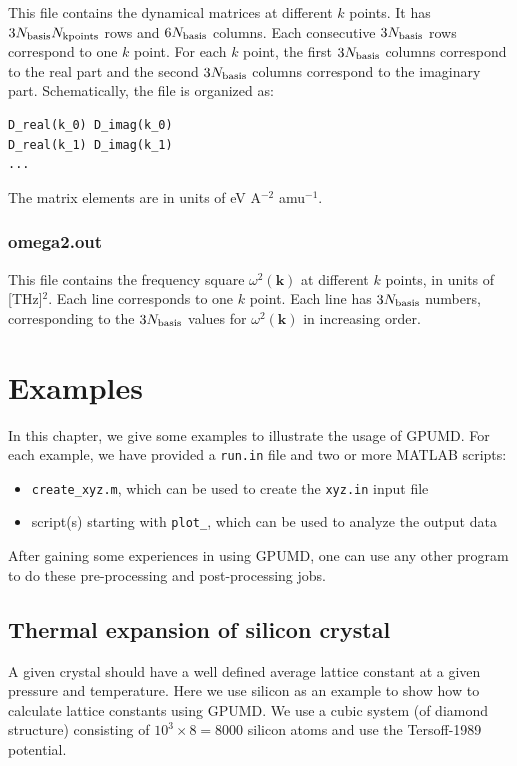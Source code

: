 \documentclass[12pt,a4paper]{report}
\newcommand{\vect}[1]{\boldsymbol{#1}}
\begin{document}
This file contains the dynamical matrices at different $k$ points. It has $3N_{\rm basis}N_{\rm kpoints}$ rows and $6N_{\rm basis}$ columns. Each consecutive $3N_{\rm basis}$ rows correspond to one $k$ point. For each $k$ point, the first $3N_{\rm basis}$ columns correspond to the real part and the second $3N_{\rm basis}$ columns correspond to the imaginary part. Schematically, the file is organized as:
\begin{verbatim}
D_real(k_0) D_imag(k_0)
D_real(k_1) D_imag(k_1)
...
\end{verbatim}
The matrix elements are in units of eV A$^{-2}$ amu$^{-1}$.

\subsection{omega2.out}

This file contains the frequency square $\omega^2(\vect{k})$ at different $k$ points, in units of [THz]$^{2}$. Each line corresponds to one $k$ point. Each line has $3N_{\rm basis}$ numbers, corresponding to the $3N_{\rm basis}$ values for $\omega^2(\vect{k})$ in increasing order. 

\chapter{Examples\label{chapter:examples}}

In this chapter, we give some examples to illustrate the usage of GPUMD. For each example, we have provided a \verb"run.in" file and two or more MATLAB scripts:
\begin{itemize}
\item \verb"create_xyz.m", which can be used to create the \verb"xyz.in" input file
\item script(s) starting with \verb"plot_", which can be used to analyze the output data
\end{itemize}
After gaining some experiences in using GPUMD, one can use any other program to do these pre-processing and post-processing jobs.


\section{Thermal expansion of silicon crystal}


A given crystal should have a well defined average lattice constant at a given pressure and temperature. Here we use silicon as an example to show how to calculate lattice constants using GPUMD. We use a cubic system (of diamond structure) consisting of $10^3\times 8 = 8000$ silicon atoms and use the Tersoff-1989 potential.
\end{document}
